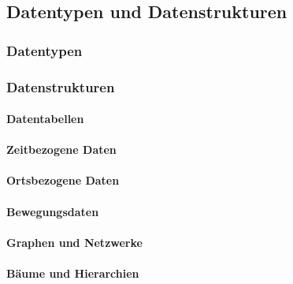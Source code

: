         \subsection{Datentypen und Datenstrukturen} %

            \subsubsection{Datentypen} %

            \subsubsection{Datenstrukturen} %

                \paragraph{Datentabellen} %

                \paragraph{Zeitbezogene Daten} %

                \paragraph{Ortsbezogene Daten} %

                \paragraph{Bewegungsdaten} %

                \paragraph{Graphen und Netzwerke} %

                \paragraph{Bäume und Hierarchien} %

